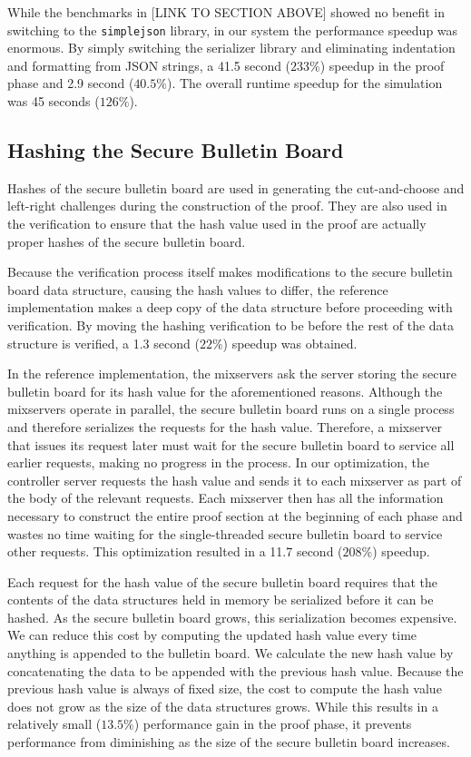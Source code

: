 While the benchmarks in [LINK TO SECTION ABOVE] showed no benefit in switching to the \texttt{simplejson} library, in our system the performance speedup was enormous. By simply switching the serializer library and eliminating indentation and formatting from JSON strings, a 41.5 second ($233\%$) speedup in the proof phase and 2.9 second ($40.5\%$). The overall runtime speedup for the simulation was 45 seconds ($126\%$).

\subsection{Hashing the Secure Bulletin Board}

Hashes of the secure bulletin board are used in generating the cut-and-choose and left-right challenges during the construction of the proof. They are also used in the verification to ensure that the hash value used in the proof are actually proper hashes of the secure bulletin board.

Because the verification process itself makes modifications to the secure bulletin board data structure, causing the hash values to differ, the reference implementation makes a deep copy of the data structure before proceeding with verification. By moving the hashing verification to be before the rest of the data structure is verified, a 1.3 second ($22\%$) speedup was obtained.

In the reference implementation, the mixservers ask the server storing the secure bulletin board for its hash value for the aforementioned reasons. Although the mixservers operate in parallel, the secure bulletin board runs on a single process and therefore serializes the requests for the hash value. Therefore, a mixserver that issues its request later must wait for the secure bulletin board to service all earlier requests, making no progress in the process. In our optimization, the controller server requests the hash value and sends it to each mixserver as part of the body of the relevant requests. Each mixserver then has all the information necessary to construct the entire proof section at the beginning of each phase and wastes no time waiting for the single-threaded secure bulletin board to service other requests. This optimization resulted in a 11.7 second ($208\%$) speedup.

Each request for the hash value of the secure bulletin board requires that the contents of the data structures held in memory be serialized before it can be hashed. As the secure bulletin board grows, this serialization becomes expensive. We can reduce this cost by computing the updated hash value every time anything is appended to the bulletin board. We calculate the new hash value by concatenating the data to be appended with the previous hash value. Because the previous hash value is always of fixed size, the cost to compute the hash value does not grow as the size of the data structures grows. While this results in a relatively small ($13.5\%$) performance gain in the proof phase, it prevents performance from diminishing as the size of the secure bulletin board increases.

